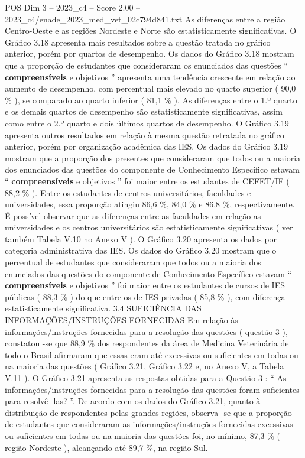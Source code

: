 \begin{textsample}{POS Dim 3 – 2023\_c4 – Score 2.00 – 2023\_c4/enade\_2023\_med\_vet\_02c794d841.txt}
As diferenças entre a região Centro-Oeste e as regiões Nordeste e Norte são estatisticamente significativas.
O Gráfico 3.18 apresenta mais resultados sobre a questão tratada no gráfico anterior, porém por quartos de desempenho.
Os dados do Gráfico 3.18 mostram que a proporção de estudantes que consideraram os enunciados das questões “ \textbf{compreensíveis} e objetivos ” apresenta uma tendência crescente em relação ao aumento de desempenho, com percentual mais elevado no quarto superior ( 90,0 \% ), se comparado ao quarto inferior ( 81,1 \% ).
As diferenças entre o 1.º quarto e os demais quartos de desempenho são estatisticamente significativas, assim como entre o 2.º quarto e dois últimos quartos de desempenho.
O Gráfico 3.19 apresenta outros resultados em relação à mesma questão retratada no gráfico anterior, porém por organização acadêmica das IES.
Os dados do Gráfico 3.19 mostram que a proporção dos presentes que consideraram que todos ou a maioria dos enunciados das questões do componente de Conhecimento Específico estavam “ \textbf{compreensíveis} e objetivos ” foi maior entre os estudantes de CEFET/IF ( 88,2 \% ).
Entre os estudantes de centros universitários, faculdades e universidades, essa proporção atingiu 86,6 \%, 84,0 \% e 86,8 \%, respectivamente.
É possível observar que as diferenças entre as faculdades em relação as universidades e os centros universitários são estatisticamente significativas ( ver também Tabela V.10 no Anexo V ).
O Gráfico 3.20 apresenta os dados por categoria administrativa das IES.
Os dados do Gráfico 3.20 mostram que o percentual de estudantes que consideraram que todos ou a maioria dos enunciados das questões do componente de Conhecimento Específico estavam “ \textbf{compreensíveis} e objetivos ” foi maior entre os estudantes de cursos de IES públicas ( 88,3 \% ) do que entre os de IES privadas ( 85,8 \% ), com diferença estatisticamente significativa. 3.4 SUFICIÊNCIA DAS INFORMAÇÕES/INSTRUÇÕES FORNECIDAS Em relação às informações/instruções fornecidas para a resolução das questões ( questão 3 ), constatou -se que 88,9 \% dos respondentes da área de Medicina Veterinária de todo o Brasil afirmaram que essas eram até excessivas ou suficientes em todas ou na maioria das questões ( Gráfico 3.21, Gráfico 3.22 e, no Anexo V, a Tabela V.11 ).
O Gráfico 3.21 apresenta as respostas obtidas para a Questão 3 : “ As informações/instruções fornecidas para a resolução das questões foram suficientes para resolvê -las? ”.
De acordo com os dados do Gráfico 3.21, quanto à distribuição de respondentes pelas grandes regiões, observa -se que a proporção de estudantes que consideraram as informações/instruções fornecidas excessivas ou suficientes em todas ou na maioria das questões foi, no mínimo, 87,3 \% ( região Nordeste ), alcançando até 89,7 \%, na região Sul.

\end{textsample}
